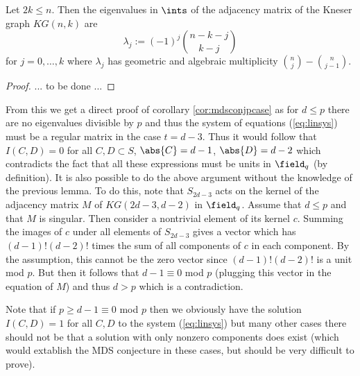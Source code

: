 \message{ !name(OnTheRAIDProblem.tex)}\documentclass[8pt,a4paper]{article}
\begin{document}
\begin{lemma}
Let $2k\leq n$. Then the eigenvalues in $\ints$ of the adjacency matrix of the Kneser graph $KG(n,k)$ are
\begin{equation}
\lambda_j:=(-1)^j\binom{n-k-j}{k-j}
\end{equation}
for $j=0,\ldots,k$ where $\lambda_j$ has geometric and algebraic multiplicity $\binom{n}{j}-\binom{n}{j-1}$.
\end{lemma}

\begin{proof}
... to be done ...
\end{proof}

From this we get a direct proof of corollary \ref{cor:mdsconjpcase} as for $d\leq p$ there are no eigenvalues divisible by $p$ and thus the system of equations (\ref{eq:linsys}) must be a regular matrix in the case $t=d-3$. Thus it would follow that $I(C,D)=0$ for all $C,D\subset S$, $\abs{C}=d-1$, $\abs{D}=d-2$ which contradicts the fact that all these expressions must be units in $\field_q$ (by definition).
It is also possible to do the above argument without the knowledge of the previous lemma. To do this, note that $S_{2d-3}$ acts on the kernel of the adjacency matrix $M$ of $KG(2d-3,d-2)$ in $\field_q$. Assume that $d\leq p$ and that $M$ is singular. Then consider a nontrivial element of its kernel $c$. Summing the images of $c$ under all elements of $S_{2d-3}$ gives a vector which has $(d-1)!(d-2)!$ times the sum of all components of $c$ in each component. By the assumption, this cannot be the zero vector since $(d-1)!(d-2)!$ is a unit mod $p$. But then it follows that $d-1\equiv 0$ mod $p$ (plugging this vector in the equation of $M$) and thus $d>p$ which is a contradiction.   

\begin{remark}
Note that if $p\geq d-1\equiv 0$ mod $p$ then we obviously have the solution $I(C,D)=1$ for all $C,D$ to the system (\ref{eq:linsys}) but many other cases there should not be that a solution with only nonzero components does exist (which would extablish the MDS conjecture in these cases, but should be very difficult to prove).
\end{remark}
\end{document}
